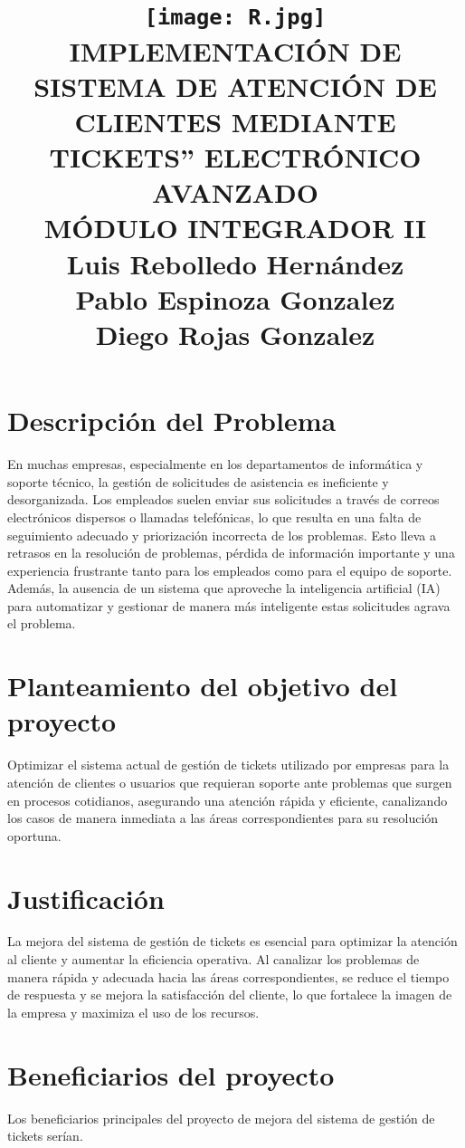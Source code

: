 \documentclass[a4paper,12pt]{article}
\title{
    \texttt{[image: R.jpg]}\\
    \vspace{4cm} %
    \textbf{\large IMPLEMENTACIÓN DE SISTEMA DE ATENCIÓN DE CLIENTES MEDIANTE 
    TICKETS” ELECTRÓNICO AVANZADO}\\
    \vspace{1cm}
    \textbf{\large MÓDULO INTEGRADOR II}\\
    \vspace{2cm}
    \textbf{\small  Luis Rebolledo Hernández}\\
    \textbf{\small  Pablo Espinoza Gonzalez}\\
    \textbf{\small  Diego Rojas Gonzalez}\\
}
\date{} %
\begin{document}
\maketitle

\newpage

\tableofcontents
\newpage


\section{Descripción del Problema}
En muchas empresas, especialmente en los departamentos de informática y soporte técnico, la gestión de solicitudes de asistencia es ineficiente y desorganizada. Los empleados suelen enviar sus solicitudes a través de correos electrónicos dispersos o llamadas telefónicas, lo que resulta en una falta de seguimiento adecuado y priorización incorrecta de los problemas. Esto lleva a retrasos en la resolución de problemas, pérdida de información importante y una experiencia frustrante tanto para los empleados como para el equipo de soporte. Además, la ausencia de un sistema que aproveche la inteligencia artificial (IA) para automatizar y gestionar de manera más inteligente estas solicitudes agrava el problema.


\section{Planteamiento del objetivo del proyecto}
Optimizar el sistema actual de gestión de tickets utilizado por empresas para la atención de clientes o usuarios que requieran soporte ante problemas que surgen en procesos cotidianos, asegurando una atención rápida y eficiente, canalizando los casos de manera inmediata a las áreas correspondientes para su resolución oportuna.

\section{Justificación}
La mejora del sistema de gestión de tickets es esencial para optimizar la atención al cliente y aumentar la eficiencia operativa. Al canalizar los problemas de manera rápida y adecuada hacia las áreas correspondientes, se reduce el tiempo de respuesta y se mejora la satisfacción del cliente, lo que fortalece la imagen de la empresa y maximiza el uso de los recursos.
\section{Beneficiarios del proyecto}
Los beneficiarios principales del proyecto de mejora del sistema de gestión de tickets serían.
\end{document}
